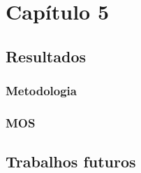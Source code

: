 
\chapter{Capítulo 5}

\section{Resultados}
\subsection{Metodologia}
\subsection{MOS}

\section{Trabalhos futuros}
